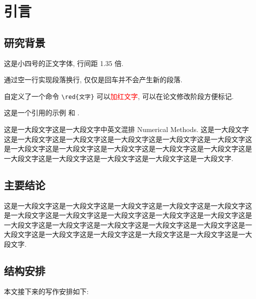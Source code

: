 \documentclass[openany,twoside,12pt]{book}
\theoremstyle{plain}
\renewcommand{\contentsname}{目~~录}
\newcommand{\red}[1]{\textcolor{red}{#1}}
\begin{document}

\renewcommand\contentsname{目~~录}
\cleardoublepage
{}
\pdfbookmark[chapter]{\contentsname}{toc}
\tableofcontents



\mainmatter   %



\chapter{引言}

\section{研究背景}

这是小四号的正文字体, 行间距 1.35 倍.

通过空一行实现段落换行, 仅仅是回车并不会产生新的段落.

自定义了一个命令 \verb|\red{文字}| 可以\red{加红文字}, 可以在论文修改阶段方便标记.

这是一个引用的示例 \cite{Tadmor2012} 和 \cite{LiLiu1997,Adams2003,TreWei2014}.

这是一大段文字这是一大段文字中英文混排 Numerical Methods. 这是一大段文字这是一大段文字这是一大段文字这是一大段文字这是一大段文字这是一大段文字这是一大段文字这是一大段文字这是一大段文字这是一大段文字这是一大段文字这是一大段文字这是一大段文字这是一大段文字这是一大段文字这是一大段文字.

\section{主要结论}

这是一大段文字这是一大段文字这是一大段文字这是一大段文字这是一大段文字这是一大段文字这是一大段文字这是一大段文字这是一大段文字这是一大段文字这是一大段文字这是一大段文字这是一大段文字这是一大段文字这是一大段文字这是一大段文字这是一大段文字这是一大段文字这是一大段文字这是一大段文字这是一大段文字.



\section{结构安排}

本文接下来的写作安排如下:
\end{document}
